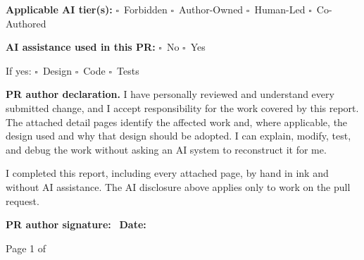 \documentclass[12pt]{article}
\newcommand{\checkbox}{\(\square\)}
\newcommand{\formsection}[1]{%
  \vspace{0.65em}\noindent{\large\bfseries #1}\par\vspace{0.35em}}
\newcommand{\fieldline}[1]{\textbf{#1}\ \hrulefill}
\begin{document}
\vspace{0.45em}
\textbf{Applicable AI tier(s):}\quad
\checkbox\ Forbidden \quad
\checkbox\ Author-Owned \quad
\checkbox\ Human-Led \quad
\checkbox\ Co-Authored

\vspace{0.45em}
\textbf{AI assistance used in this PR:}\quad
\checkbox\ No \quad
\checkbox\ Yes

\quad If yes: \checkbox\ Design \quad \checkbox\ Code \quad
\checkbox\ Tests

\formsection{III. Declaration}

\textbf{PR author declaration.} I have personally reviewed and understand every
submitted change, and I accept responsibility for the work covered by this
report. The attached detail pages identify the affected work and, where
applicable, the design used and why that design should be adopted. I can
explain, modify, test, and debug the work without asking an AI system to
reconstruct it for me.

\vspace{0.5em}
I completed this report, including every attached page, by hand in ink and
without AI assistance. The AI disclosure above applies only to work on the
pull request.

\vspace{1em}
\fieldline{PR author signature:}
\hspace{1.5em}
\fieldline{Date:}

\vfill
\begin{center}
  \small Page 1 of \underline{\hspace{1.3cm}}
\end{center}
\end{document}
